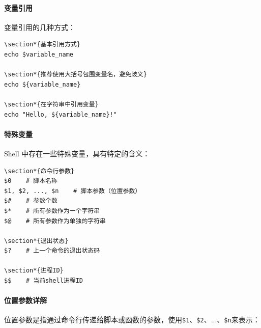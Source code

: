 \documentclass[12pt,UTF8]{ctexbook}
\begin{document}
\paragraph{变量引用}
变量引用的几种方式：
\begin{verbatim}
\section*{基本引用方式}
echo $variable_name

\section*{推荐使用大括号包围变量名，避免歧义}
echo ${variable_name}

\section*{在字符串中引用变量}
echo "Hello, ${variable_name}!"
\end{verbatim}

\paragraph{特殊变量}
Shell 中存在一些特殊变量，具有特定的含义：
\begin{verbatim}
\section*{命令行参数}
$0    # 脚本名称
$1, $2, ..., $n    # 脚本参数（位置参数）
$#    # 参数个数
$*    # 所有参数作为一个字符串
$@    # 所有参数作为单独的字符串

\section*{退出状态}
$?    # 上一个命令的退出状态码

\section*{进程ID}
$$    # 当前shell进程ID
\end{verbatim}

\paragraph{位置参数详解}
位置参数是指通过命令行传递给脚本或函数的参数，使用\texttt{\$1}、\texttt{\$2}、...、\texttt{\$n}来表示：
\end{document}
